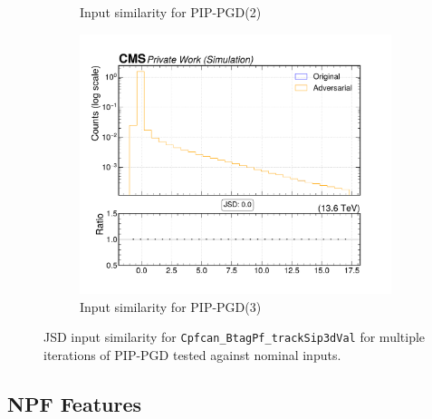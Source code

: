 \begin{figure}[htbp]
\begin{subfigure}[t]{0.32\textwidth}
    \caption*{Input similarity for PIP-PGD(2)}
  \end{subfigure}\hfill
  \begin{subfigure}[t]{0.32\textwidth}
    \includegraphics[width=\linewidth]{media/output/features/compare/combined_it_3/cmp_cpf_arr_Cpfcan_BtagPf_trackSip3dVal.pdf}
    \caption*{Input similarity for PIP-PGD(3)}
  \end{subfigure}

  \caption*{JSD input similarity for \texttt{Cpfcan\_BtagPf\_trackSip3dVal} for multiple iterations of PIP-PGD tested against nominal inputs.}
  \label{fig:combined_input_Cpfcan_BtagPf_trackSip3dVal}
\end{figure}

\newpage
\subsection*{NPF Features}


